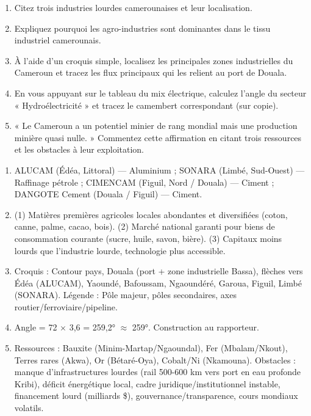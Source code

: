 \documentclass[11pt]{article}
\begin{document}
\begin{exercice}
\begin{enumerate}
\item Citez trois industries lourdes camerounaises et leur localisation.
\item Expliquez pourquoi les agro-industries sont dominantes dans le tissu industriel camerounais.
\item À l'aide d'un croquis simple, localisez les principales zones industrielles du Cameroun et tracez les flux principaux qui les relient au port de Douala.
\item En vous appuyant sur le tableau du mix électrique, calculez l'angle du secteur « Hydroélectricité » et tracez le camembert correspondant (sur copie).
\item « Le Cameroun a un potentiel minier de rang mondial mais une production minière quasi nulle. » Commentez cette affirmation en citant trois ressources et les obstacles à leur exploitation.
\end{enumerate}
\end{exercice}

\begin{corrige}[Exercice n°1]
\begin{enumerate}
\item ALUCAM (Édéa, Littoral) — Aluminium ; SONARA (Limbé, Sud-Ouest) — Raffinage pétrole ; CIMENCAM (Figuil, Nord / Douala) — Ciment ; DANGOTE Cement (Douala / Figuil) — Ciment.
\item (1) Matières premières agricoles locales abondantes et diversifiées (coton, canne, palme, cacao, bois). (2) Marché national garanti pour biens de consommation courante (sucre, huile, savon, bière). (3) Capitaux moins lourds que l'industrie lourde, technologie plus accessible.
\item Croquis : Contour pays, Douala (port + zone industrielle Bassa), flèches vers Édéa (ALUCAM), Yaoundé, Bafoussam, Ngaoundéré, Garoua, Figuil, Limbé (SONARA). Légende : Pôle majeur, pôles secondaires, axes routier/ferroviaire/pipeline.
\item Angle = 72 $\times$ 3,6 = 259,2° $\approx$ 259°. Construction au rapporteur.
\item Ressources : Bauxite (Minim-Martap/Ngaoundal), Fer (Mbalam/Nkout), Terres rares (Akwa), Or (Bétaré-Oya), Cobalt/Ni (Nkamouna). Obstacles : manque d'infrastructures lourdes (rail 500-600 km vers port en eau profonde Kribi), déficit énergétique local, cadre juridique/institutionnel instable, financement lourd (milliards \$), gouvernance/transparence, cours mondiaux volatils.
\end{enumerate}
\end{corrige}
\end{document}
